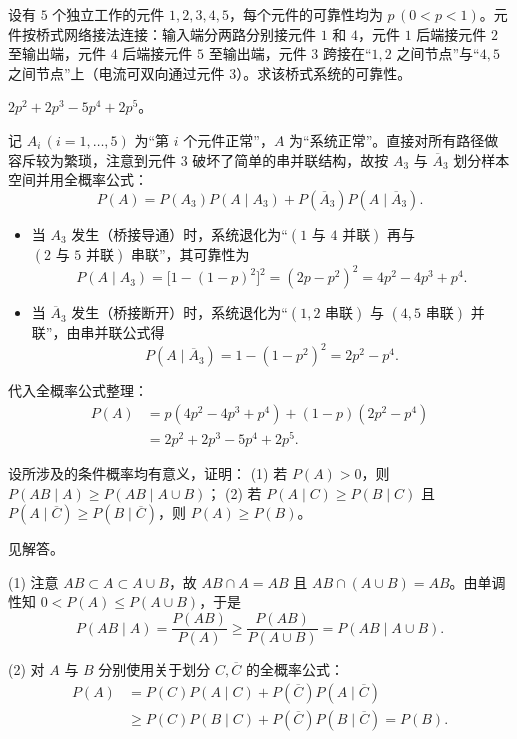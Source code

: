 \begin{exercise}[title={桥式系统的可靠性},level=standard,points=10,tags={独立性,全概率公式,可靠性}]
设有 $5$ 个独立工作的元件 $1,2,3,4,5$，每个元件的可靠性均为 $p\,(0<p<1)$。元件按桥式网络接法连接：输入端分两路分别接元件 $1$ 和 $4$，元件 $1$ 后端接元件 $2$ 至输出端，元件 $4$ 后端接元件 $5$ 至输出端，元件 $3$ 跨接在“$1,2$ 之间节点”与“$4,5$ 之间节点”上（电流可双向通过元件 $3$）。求该桥式系统的可靠性。
\begin{answer}
$2p^2+2p^3-5p^4+2p^5$。
\end{answer}
\begin{solution}
记 $A_i\,(i=1,\ldots,5)$ 为“第 $i$ 个元件正常”，$A$ 为“系统正常”。直接对所有路径做容斥较为繁琐，注意到元件 $3$ 破坏了简单的串并联结构，故按 $A_3$ 与 $\overline{A}_3$ 划分样本空间并用全概率公式：
\[
  P(A)=P(A_3)P(A\mid A_3)+P(\overline{A}_3)P(A\mid\overline{A}_3).
\]
\begin{itemize}
  \item 当 $A_3$ 发生（桥接导通）时，系统退化为“$(1\text{ 与 }4\text{ 并联})$ 再与 $(2\text{ 与 }5\text{ 并联})$ 串联”，其可靠性为
  \[
    P(A\mid A_3)=\bigl[1-(1-p)^2\bigr]^2=(2p-p^2)^2=4p^2-4p^3+p^4.
  \]
  \item 当 $\overline{A}_3$ 发生（桥接断开）时，系统退化为“$(1,2\text{ 串联})$ 与 $(4,5\text{ 串联})$ 并联”，由串并联公式得
  \[
    P(A\mid\overline{A}_3)=1-(1-p^2)^2=2p^2-p^4.
  \]
\end{itemize}
代入全概率公式整理：
\[
\begin{aligned}
  P(A)&=p(4p^2-4p^3+p^4)+(1-p)(2p^2-p^4)\\
  &=2p^2+2p^3-5p^4+2p^5.
\end{aligned}
\]
\end{solution}
\end{exercise}

\begin{exercise}[title={条件概率不等式证明},level=advanced,points=10,tags={条件概率,证明}]
设所涉及的条件概率均有意义，证明：
(1) 若 $P(A)>0$，则 $P(AB\mid A)\ge P(AB\mid A\cup B)$；
(2) 若 $P(A\mid C)\ge P(B\mid C)$ 且 $P(A\mid\overline{C})\ge P(B\mid\overline{C})$，则 $P(A)\ge P(B)$。
\begin{answer}
见解答。
\end{answer}
\begin{solution}
(1) 注意 $AB\subset A\subset A\cup B$，故 $AB\cap A=AB$ 且 $AB\cap(A\cup B)=AB$。由单调性知 $0<P(A)\le P(A\cup B)$，于是
\[
  P(AB\mid A)=\frac{P(AB)}{P(A)}\ge\frac{P(AB)}{P(A\cup B)}=P(AB\mid A\cup B).
\]

(2) 对 $A$ 与 $B$ 分别使用关于划分 $C,\overline{C}$ 的全概率公式：
\[
\begin{aligned}
  P(A)&=P(C)P(A\mid C)+P(\overline{C})P(A\mid\overline{C})\\
  &\ge P(C)P(B\mid C)+P(\overline{C})P(B\mid\overline{C})=P(B).
\end{aligned}
\]
\end{solution}
\end{exercise}

